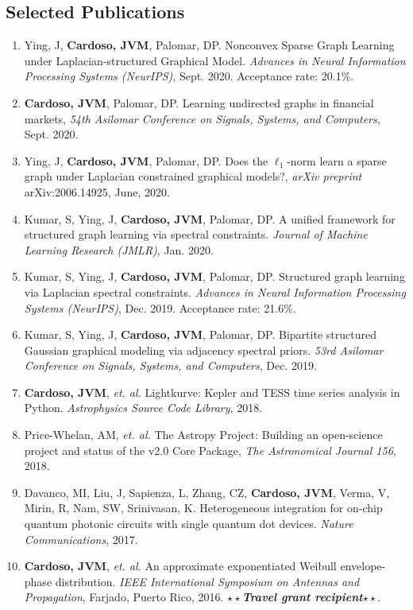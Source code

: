 \documentclass[10pt]{article}
\begin{document}
\begin{titlepage}
\section*{Selected Publications}
\begin{enumerate}
  \item Ying, J, \textbf{Cardoso, JVM}, Palomar, DP. Nonconvex Sparse Graph Learning under Laplacian-structured Graphical Model.
  \textit{Advances in Neural Information Processing Systems (NeurIPS)}, Sept. 2020. Acceptance rate: 20.1\%.
  \item \textbf{Cardoso, JVM}, Palomar, DP. Learning undirected graphs in financial markets, \textit{54th Asilomar Conference on Signals, Systems, and Computers}, Sept. 2020.
  \item Ying, J, \textbf{Cardoso, JVM}, Palomar, DP. Does the $\ell_1$-norm learn a sparse graph under Laplacian constrained graphical models?, \textit{arXiv preprint} arXiv:2006.14925, June, 2020.
  \item Kumar, S, Ying, J, \textbf{Cardoso, JVM}, Palomar, DP. A unified framework for structured graph
    learning via spectral constraints. \textit{Journal of Machine Learning Research (JMLR)}, Jan. 2020.
  \item Kumar, S, Ying, J, \textbf{Cardoso, JVM}, Palomar, DP. Structured graph learning via Laplacian
    spectral constraints. \textit{Advances in Neural Information Processing Systems (NeurIPS)}, Dec. 2019. Acceptance rate: 21.6\%.
  \item Kumar, S, Ying, J, \textbf{Cardoso, JVM}, Palomar, DP. Bipartite structured Gaussian graphical modeling via adjacency spectral priors. \textit{53rd Asilomar Conference on Signals, Systems, and Computers}, Dec. 2019.
  \item \textbf{Cardoso, JVM}, \textit{et. al.} Lightkurve: Kepler and TESS time series analysis in Python. \textit{Astrophysics Source Code Library}, 2018.
  \item Price-Whelan, AM, \textit{et. al.} The Astropy Project: Building an open-science project and status of the v2.0 Core Package, \textit{The Astronomical Journal 156}, 2018.
\item Davanco, MI, Liu, J, Sapienza, L, Zhang, CZ, \textbf{Cardoso, JVM}, Verma, V, Mirin, R, Nam,
SW, Srinivasan, K. Heterogeneous integration for on-chip quantum photonic circuits with single quantum dot devices.
\textit{Nature Communications}, 2017.
\item \textbf{Cardoso, JVM}, \textit{et. al.} An approximate exponentiated Weibull envelope-phase distribution.
\textit{IEEE International Symposium on Antennas and Propagation}, Farjado, Puerto Rico, 2016.
$\star\star$\textbf{\textit{Travel grant recipient}}$\star\star$.
\end{enumerate}


\end{titlepage}
\end{document}
